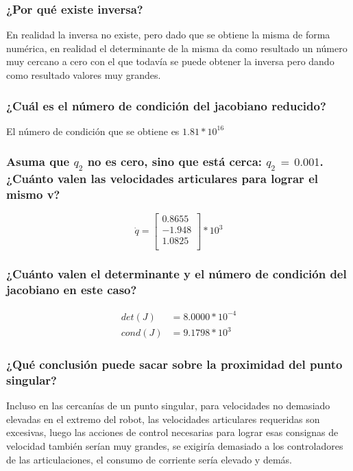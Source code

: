 \documentclass[a4paper,12pt]{article}
\begin{document}
\subsubsection{¿Por qué existe inversa?}
En realidad la inversa no existe, pero dado que se obtiene la misma de forma numérica, en realidad
el determinante de la misma da como resultado un número muy cercano a cero con
el que todavía se puede obtener la inversa pero dando como resultado valores muy grandes.

\subsubsection{¿Cuál es el número de condición del jacobiano reducido?}
El número de condición que se obtiene es $1.81*10^{16}$

\subsubsection{Asuma que $q_2$ no es cero, sino que está cerca: $q_2\,=\,0.001$. ¿Cuánto valen las
velocidades articulares para lograr el mismo v?}

\begin{equation*}
    \dot{q} =
    \begin{bmatrix}
        0.8655\\
        -1.948\\
        1.0825\\
    \end{bmatrix}*10^{3}
\end{equation*}

\subsubsection{¿Cuánto valen el determinante y el número de condición del jacobiano en este
caso?}

\begin{align*}
    det(J)  &= 8.0000*10^{-4}\\
    cond(J) &= 9.1798*10^{3}
\end{align*}

\subsubsection{¿Qué conclusión puede sacar sobre la proximidad del punto singular?
}
Incluso en las cercanías de un punto singular, para velocidades
no demasiado elevadas en el extremo del robot, las velocidades articulares requeridas
son excesivas, luego las acciones de control necesarias para lograr esas consignas de velocidad también 
serían muy grandes, se exigiría demasiado a los controladores de las articulaciones, el consumo de corriente
sería elevado y demás.
\end{document}

